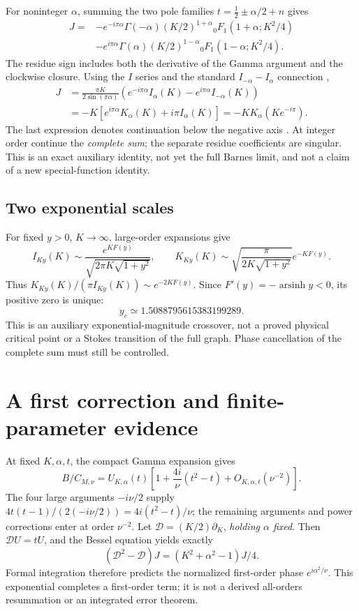 \documentclass[11pt,a4paper]{article}
\begin{document}
For noninteger \(\alpha\), summing the two pole families
\(t=\tfrac12\pm\alpha/2+n\) gives
\begin{align}
 J={}&-e^{-i\pi\alpha}\Gamma(-\alpha)(K/2)^{1+\alpha}
 {}_0F_1(1+\alpha;K^2/4)\nonumber\\
 &-e^{i\pi\alpha}\Gamma(\alpha)(K/2)^{1-\alpha}
 {}_0F_1(1-\alpha;K^2/4).
\end{align}
The residue sign includes both the derivative of the Gamma argument
and the clockwise closure. Using the \(I\) series and the standard
\(I_{-\alpha}-I_\alpha\) connection \cite{iseries,connection},
\begin{align}
 J&=\frac{\pi K}{2\sin(\pi\alpha)}
 \left(e^{-i\pi\alpha}I_\alpha(K)-e^{i\pi\alpha}I_{-\alpha}(K)\right)\\
 &=-K\left[e^{i\pi\alpha}K_\alpha(K)+i\pi I_\alpha(K)\right]
 =-K K_\alpha(Ke^{-i\pi}). \label{eq:J}
\end{align}
The last expression denotes continuation below the negative axis
\cite{continuation}. At integer order continue the \emph{complete sum};
the separate residue coefficients are singular.
This is an exact auxiliary identity, not yet the full Barnes limit,
and not a claim of a new special-function identity.

\subsection*{Two exponential scales}
For fixed \(y>0\), \(K\to\infty\), large-order expansions \cite{largeorder}
give
\[
 I_{Ky}(K)\sim\frac{e^{KF(y)}}{\sqrt{2\pi K\sqrt{1+y^2}}},
 \qquad
 K_{Ky}(K)\sim\sqrt{\frac{\pi}{2K\sqrt{1+y^2}}}e^{-KF(y)}.
\]
Thus \(K_{Ky}(K)/(\pi I_{Ky}(K))\sim e^{-2KF(y)}\).
Since \(F'(y)=-\operatorname{arsinh}y<0\), its positive zero is unique:
\[
 y_c\simeq1.5088795615383199289.
\]
This is an auxiliary exponential-magnitude crossover, not a proved
physical critical point or a Stokes transition of the full graph.
Phase cancellation of the complete sum must still be controlled.

\newpage
\section{A first correction and finite-parameter evidence}
At fixed \(K,\alpha,t\), the compact Gamma expansion gives
\[
 B/C_{M,\nu}=U_{K,\alpha}(t)
 \left[1+\frac{4i}{\nu}(t^2-t)+O_{K,\alpha,t}(\nu^{-2})\right].
\]
The four large arguments \(-i\nu/2\) supply
\(4t(t-1)/(2(-i\nu/2))=4i(t^2-t)/\nu\);
the remaining arguments and power corrections enter at order \(\nu^{-2}\).
Let \(\mathcal D=(K/2)\partial_K\), \emph{holding \(\alpha\) fixed}.
Then \(\mathcal DU=tU\), and the Bessel equation yields exactly
\[
 (\mathcal D^2-\mathcal D)J=(K^2+\alpha^2-1)J/4.
\]
Formal integration therefore predicts the normalized first-order phase
\(e^{i\alpha^2/\nu}\). This exponential completes a first-order term;
it is not a derived all-orders resummation or an integrated error theorem.
\end{document}
